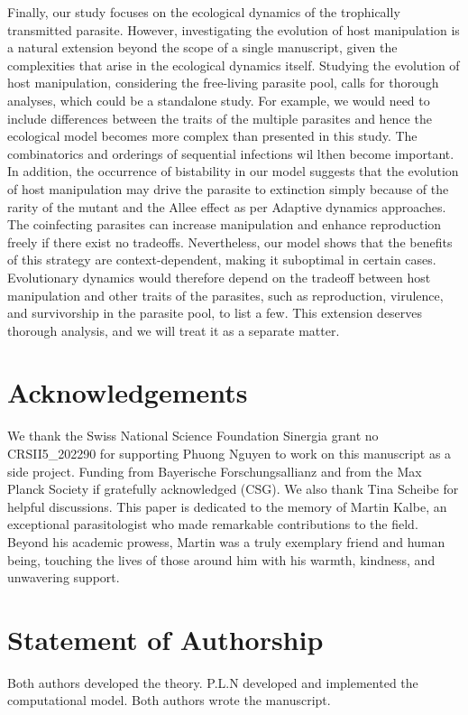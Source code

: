 \documentclass[a4paper]{scrartcl}
\begin{document}
Finally, our study focuses on the ecological dynamics of the trophically transmitted parasite. 
However, investigating the evolution of host manipulation is a natural extension beyond the scope of a single manuscript, given the complexities that arise in the ecological dynamics itself.
Studying the evolution of host manipulation, considering the free-living parasite pool, calls for thorough analyses, which could be a standalone study. 
For example, we would need to include differences between the traits of the multiple parasites and hence the ecological model becomes more complex than presented in this study.
The combinatorics and orderings of sequential infections wil lthen become important.
In addition, the occurrence of bistability in our model suggests that the evolution of host manipulation may drive the parasite to extinction simply because of the rarity of the mutant and the Allee effect as per Adaptive dynamics approaches. 
The coinfecting parasites can increase manipulation and enhance reproduction freely if there exist no tradeoffs. 
Nevertheless, our model shows that the benefits of this strategy are context-dependent, making it suboptimal in certain cases. 
Evolutionary dynamics would therefore depend on the tradeoff between host manipulation and other traits of the parasites, such as reproduction, virulence, and survivorship in the parasite pool, to list a few. 
This extension deserves thorough analysis, and we will treat it as a separate matter.


\section*{Acknowledgements} 
We thank the Swiss National Science Foundation Sinergia grant no CRSII5\_202290 for supporting Phuong Nguyen to work on this manuscript as a side project.
Funding from Bayerische Forschungsallianz and from the Max Planck Society if gratefully acknowledged (CSG).
We also thank Tina Scheibe for helpful discussions.
This paper is dedicated to the memory of Martin Kalbe, an exceptional parasitologist who made remarkable contributions to the field.
Beyond his academic prowess, Martin was a truly exemplary friend and human being, touching the lives of those around him with his warmth, kindness, and unwavering support.

\section*{Statement of Authorship}
Both authors developed the theory.
P.L.N developed and implemented the computational model.
Both authors wrote the manuscript.
 
\end{document}
